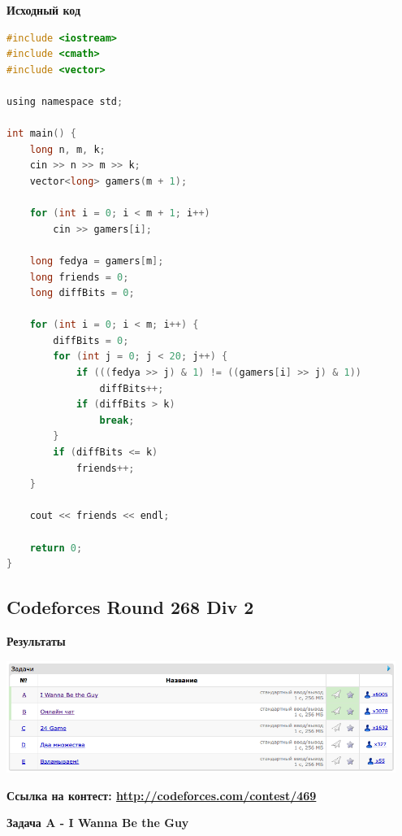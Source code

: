 \documentclass[a4paper,12pt]{article}
\begin{document}
\newpage
\textbf{{\large Исходный код}} \\
\begin{lstlisting}[language=C]
#include <iostream>
#include <cmath>
#include <vector>

using namespace std;

int main() {
    long n, m, k;
    cin >> n >> m >> k;
    vector<long> gamers(m + 1);

    for (int i = 0; i < m + 1; i++)
        cin >> gamers[i];

    long fedya = gamers[m];
    long friends = 0;
    long diffBits = 0;

    for (int i = 0; i < m; i++) {
        diffBits = 0;
        for (int j = 0; j < 20; j++) {
            if (((fedya >> j) & 1) != ((gamers[i] >> j) & 1))
                diffBits++;
            if (diffBits > k)
                break;
        }
        if (diffBits <= k)
            friends++;
    }

    cout << friends << endl;

    return 0;
}
\end{lstlisting}



%
%

\newpage
\subsection{Codeforces Round 268 Div 2}

\textbf{{\large Результаты}} \\
\begin{center}
\includegraphics[width=0.95\textwidth]{C_268/C_268_result.png}\\ [1cm]
\end{center}

\textbf{{\large Ссылка на контест: \url{http://codeforces.com/contest/469}}}

\newpage
\textbf{{\large Задача A - I Wanna Be the Guy}}
\end{document}
